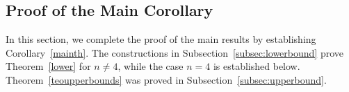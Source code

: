 \documentclass{article}
\newcommand{\blue}[1]{\textcolor{blue}{#1}}
\newcommand{\red}[1]{\textcolor{red}{#1}}
\begin{document}

\subsection{Proof of the Main Corollary}
\label{subsec:theorems}
In this section, we complete the proof of the main results by
establishing Corollary~\ref{mainth}. The constructions in Subsection~\ref{subsec:lowerbound} prove
Theorem~\ref{lower} for $n\neq 4$, while the case $n=4$ is established
below. Theorem~\ref{teoupperbounds} was proved in Subsection~\ref{subsec:upperbound}.
\end{document}
